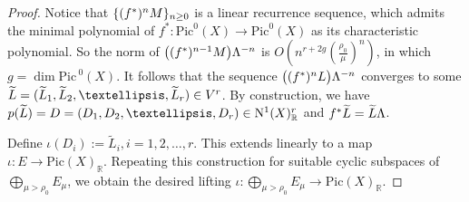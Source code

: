 \documentclass[10pt,a4paper]{amsart}
\newcommand\Pic{\mathrm{Pic\,}}
\newcommand\ra{\rightarrow}
\newcommand\wt{\widetilde}
\newcommand{\mb}[1]{\mathbb{#1}}
\newcommand{\mib}[1]{\textit{\textbf{#1}}}
\newcommand{\mr}[1]{\mathrm{#1}}
\begin{document}
\begin{proof}
Notice that $\{(f^*)^n\mib{M}\}_{n\geq0}$ is a linear recurrence sequence, which admits the minimal polynomial of $f^*:\mr{Pic}^0(X)\rightarrow\mr{Pic}^0(X)$ as its characteristic polynomial. So the norm of $\big((f^{*})^{n-1}\mib{M}\big)\Lambda^{-n}$ is $O(n^{r+2g}(\frac{\rho_0}{\mu})^n)$, in which $g=\dim\Pic^0(X)$. It follows that the sequence $\big((f^*)^n\mib{L}\big)\Lambda^{-n}$ converges to some $\wt{\mib{L}}=(\wt{L}_1,\wt{L}_2,\ldots,\wt{L}_r)\in V^{r}$. By construction, we have $p(\wt{\mib{L}})=\mib{D}=(D_1,D_2,\ldots,D_r)\in\mr{N}^1(X)_{\mb{R}}^{r}$ and $f^*\wt{\mib{L}}=\wt{\mib{L}}\Lambda$.

Define $\iota(D_i):=\wt{L}_i, i=1,2,\ldots,r$. This extends linearly to a map $\iota: E\ra \mr{Pic}(X)_{\mb{R}}$. Repeating this construction for suitable cyclic subspaces of $\bigoplus\limits_{\mu>\rho_0}E_{\mu}$, we obtain the desired lifting $\iota:\bigoplus\limits_{\mu>\rho_0}E_{\mu} \ra \mr{Pic}(X)_{\mb{R}}$.
\end{proof}
\end{document}
